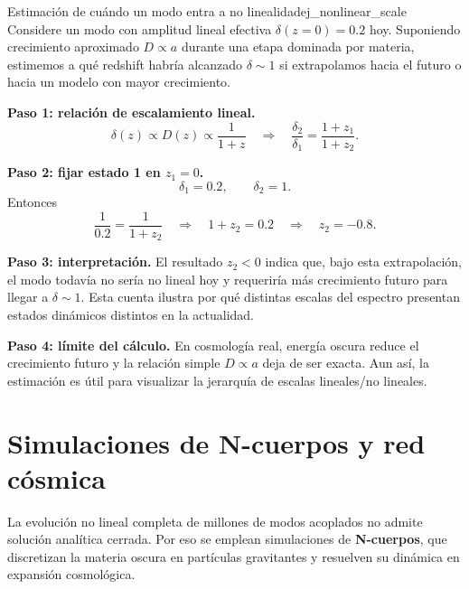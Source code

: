 \begin{ejemplo}{Estimación de cuándo un modo entra a no linealidad}{ej_nonlinear_scale}
Considere un modo con amplitud lineal efectiva $\delta(z=0)=0.2$ hoy. Suponiendo crecimiento aproximado $D\propto a$ durante una etapa dominada por materia, estimemos a qué redshift habría alcanzado $\delta\sim1$ si extrapolamos hacia el futuro o hacia un modelo con mayor crecimiento.

\textbf{Paso 1: relación de escalamiento lineal.}
\begin{equation}
\delta(z)\propto D(z)\propto \frac{1}{1+z}
\quad\Rightarrow\quad
\frac{\delta_2}{\delta_1}=\frac{1+z_1}{1+z_2}.
\end{equation}

\textbf{Paso 2: fijar estado 1 en $z_1=0$.}
\begin{equation}
\delta_1=0.2,
\qquad
\delta_2=1.
\end{equation}
Entonces
\begin{equation}
\frac{1}{0.2}=\frac{1}{1+z_2}
\quad\Rightarrow\quad
1+z_2=0.2
\quad\Rightarrow\quad
z_2=-0.8.
\end{equation}

\textbf{Paso 3: interpretación.}
El resultado $z_2<0$ indica que, bajo esta extrapolación, el modo todavía no sería no lineal hoy y requeriría más crecimiento futuro para llegar a $\delta\sim1$. Esta cuenta ilustra por qué distintas escalas del espectro presentan estados dinámicos distintos en la actualidad.

\textbf{Paso 4: límite del cálculo.}
En cosmología real, energía oscura reduce el crecimiento futuro y la relación simple $D\propto a$ deja de ser exacta. Aun así, la estimación es útil para visualizar la jerarquía de escalas lineales/no lineales.
\end{ejemplo}

\section{Simulaciones de N-cuerpos y red cósmica}
\label{sec:nbody}

La evolución no lineal completa de millones de modos acoplados no admite solución analítica cerrada. Por eso se emplean simulaciones de \textbf{N-cuerpos}, que discretizan la materia oscura en partículas gravitantes y resuelven su dinámica en expansión cosmológica.

